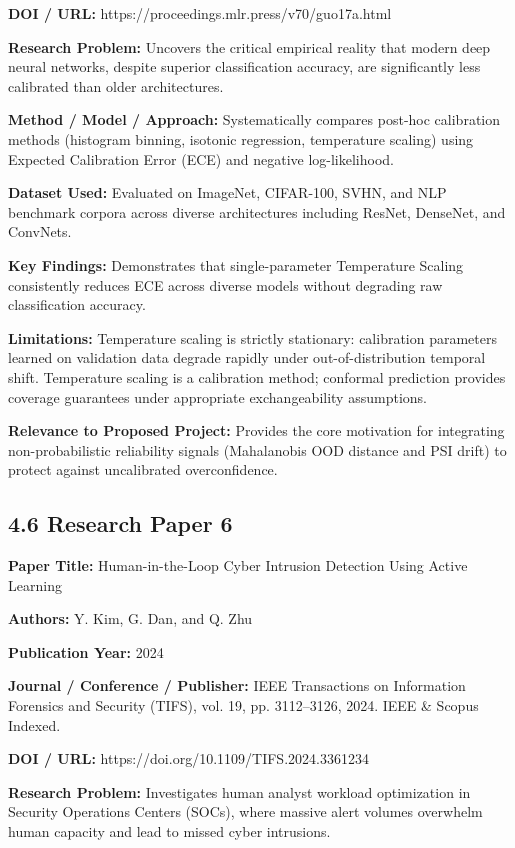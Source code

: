 \textbf{DOI / URL:} https://proceedings.mlr.press/v70/guo17a.html

\textbf{Research Problem:} Uncovers the critical empirical reality that modern deep neural networks, despite superior classification accuracy, are significantly less calibrated than older architectures.

\textbf{Method / Model / Approach:} Systematically compares post-hoc calibration methods (histogram binning, isotonic regression, temperature scaling) using Expected Calibration Error (ECE) and negative log-likelihood.

\textbf{Dataset Used:} Evaluated on ImageNet, CIFAR-100, SVHN, and NLP benchmark corpora across diverse architectures including ResNet, DenseNet, and ConvNets.

\textbf{Key Findings:} Demonstrates that single-parameter Temperature Scaling consistently reduces ECE across diverse models without degrading raw classification accuracy.

\textbf{Limitations:} Temperature scaling is strictly stationary: calibration parameters learned on validation data degrade rapidly under out-of-distribution temporal shift. Temperature scaling is a calibration method; conformal prediction provides coverage guarantees under appropriate exchangeability assumptions.

\textbf{Relevance to Proposed Project:} Provides the core motivation for integrating non-probabilistic reliability signals (Mahalanobis OOD distance and PSI drift) to protect against uncalibrated overconfidence.

\subsection{4.6 Research Paper 6}

\textbf{Paper Title:} Human-in-the-Loop Cyber Intrusion Detection Using Active Learning

\textbf{Authors:} Y. Kim, G. Dan, and Q. Zhu

\textbf{Publication Year:} 2024

\textbf{Journal / Conference / Publisher:} IEEE Transactions on Information Forensics and Security (TIFS), vol. 19, pp. 3112--3126, 2024. IEEE \& Scopus Indexed.

\textbf{DOI / URL:} https://doi.org/10.1109/TIFS.2024.3361234

\textbf{Research Problem:} Investigates human analyst workload optimization in Security Operations Centers (SOCs), where massive alert volumes overwhelm human capacity and lead to missed cyber intrusions.

